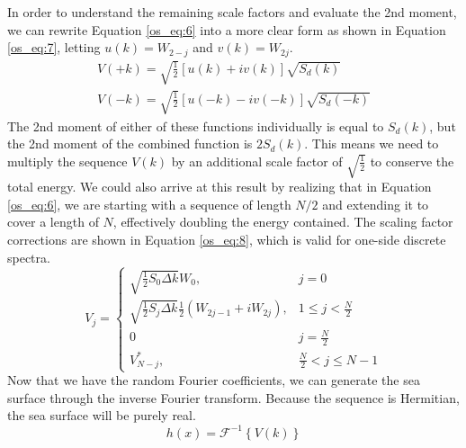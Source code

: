 In order to understand the remaining scale factors and evaluate the 2nd moment, we can rewrite Equation \ref{os_eq:6} into a more clear form as shown in Equation \ref{os_eq:7}, letting $u(k) = W_{2-j}$ and $v(k) = W_{2j}$.
\begin{equation}
  \begin{gathered}
  \label{os_eq:7}
  V(+k) = \sqrt{\frac{1}{2}}\left[u(k) + iv(k) \right]\sqrt{S_d(k)} \\
  V(-k) = \sqrt{\frac{1}{2}}\left[u(-k) - iv(-k) \right]\sqrt{S_d(-k)}
  \end{gathered}
\end{equation}
The 2nd moment of either of these functions individually is equal to $S_d(k)$, but the 2nd moment of the combined function is $2S_d(k)$. This means we need to multiply the sequence $V(k)$ by an additional scale factor of $\sqrt{\frac{1}{2}}$ to conserve the total energy. We could also arrive at this result by realizing that in Equation \ref{os_eq:6}, we are starting with a sequence of length $N/2$ and extending it to cover a length of $N$, effectively doubling the energy contained. The scaling factor corrections are shown in Equation \ref{os_eq:8}, which is valid for one-side discrete spectra.
\begin{equation}
  \label{os_eq:8}   
  V_j = \begin{cases}
    \sqrt{\frac{1}{2}S_0\Delta k}W_0, & j = 0 \\
    \sqrt{\frac{1}{2}S_j\Delta k}\frac{1}{2}\left(W_{2j-1} + iW_{2j} \right), & 1 \leq j < \frac{N}{2} \\
    0 & j = \frac{N}{2} \\
    V_{N-j}^*, &  \frac{N}{2} < j \leq N-1 
  \end{cases} 
\end{equation}
Now that we have the random Fourier coefficients, we can generate the sea surface through the inverse Fourier transform. Because the sequence is Hermitian, the sea surface will be purely real.
\begin{equation}
  \label{os_eq:9}
  h(x) = \mathcal{F}^{-1}\left\{V(k) \right\}
  \end{equation}

